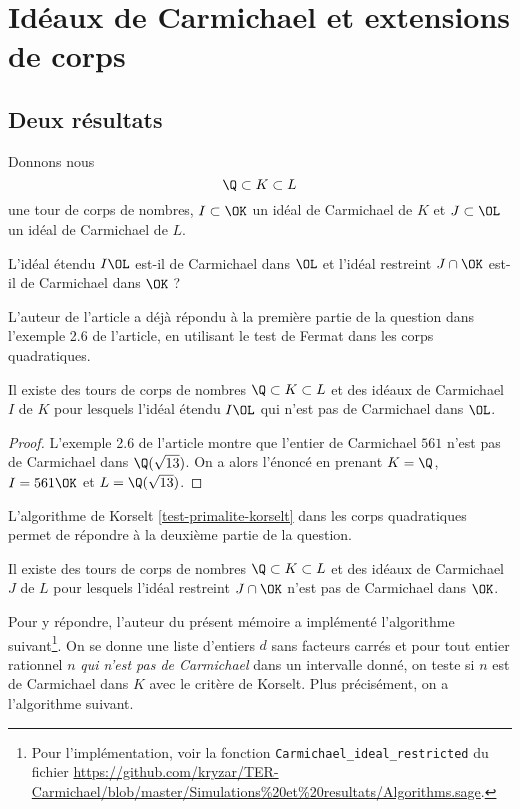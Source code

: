\section{Idéaux de Carmichael et extensions de corps}

\subsection{Deux résultats}

Donnons nous \[\Q\subset K \subset L\] une tour de corps de nombres, $I\subset \OK$ un idéal de Carmichael de $K$ et $J \subset \OL$ un idéal de Carmichael de $L$. 

\begin{question}
	L'idéal étendu $I\OL$ est-il de Carmichael dans $\OL$ et l'idéal restreint $J\cap\OK$ est-il de Carmichael dans $\OK$ ? 
\end{question}

L'auteur de l'article a déjà répondu à la première partie de la question dans l'exemple 2.6 de l'article, en utilisant le test de Fermat dans les corps quadratiques.

\begin{proposition}\label{premier-ce}
	Il existe des tours de corps de nombres $\Q\subset K \subset L$ et des idéaux de Carmichael $I$ de $K$ pour lesquels l'idéal étendu $I\OL$ qui n'est pas de Carmichael dans $\OL$.
\end{proposition}

\begin{proof}
	L'exemple 2.6 de l'article montre que l'entier de Carmichael $561$ n'est pas de Carmichael dans $\Q(\sqrt{13})$. On a alors l'énoncé en prenant $K = \Q$, $I = 561\OK$ et $L = \Q(\sqrt{13})$.
\end{proof}

L'algorithme de Korselt \ref{test-primalite-korselt} dans les corps quadratiques permet de répondre à la deuxième partie de la question. 

\begin{proposition}\label{deuxieme-ce}
	Il existe des tours de corps de nombres $\Q\subset K \subset L$ et des idéaux de Carmichael $J$ de $L$ pour lesquels l'idéal restreint $J\cap \OK$ n'est pas de Carmichael dans $\OK$.
\end{proposition}

Pour y répondre, l'auteur du présent mémoire a implémenté l'algorithme suivant\footnote{Pour l'implémentation, voir la fonction \texttt{Carmichael\_ideal\_restricted} du fichier \url{https://github.com/kryzar/TER-Carmichael/blob/master/Simulations\%20et\%20resultats/Algorithms.sage}.}. On se donne une liste d'entiers $d$ sans facteurs carrés et pour tout entier rationnel $n$ \emph{qui n'est pas de Carmichael} dans un intervalle donné, on teste si $n$ est de Carmichael dans $K$ avec le critère de Korselt. Plus précisément, on a l'algorithme suivant.

